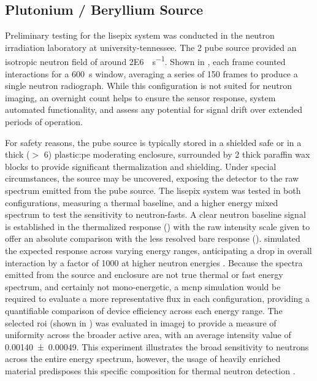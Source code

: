 \documentclass[../../../main.tex]{subfiles}%
\begin{document}
%
    \subsection{Plutonium / Beryllium Source}%
    \label{sec:chapter-4:semiconductor-timepix:pube-source}%
    Preliminary testing for the \gls{lisepix} system was conducted in the neutron irradiation laboratory at \gls{university-tennessee}.
    The \SI{2}{\curie} \gls{pube} source provided an isotropic neutron field of around \SI[per-mode={symbol}]{2E6}{\neutron\per\second}.
    Shown in , each frame counted interactions for a \SI{600}{\second} window, averaging a series of \num{150} frames to produce a single neutron radiograph.
    While this configuration is not suited for neutron imaging, an overnight count helps to ensure the sensor response, system automated functionality, and assess any potential for signal drift over extended periods of operation.
    \par%
    For safety reasons, the \gls{pube} source is typically stored in a shielded safe or in a thick ($>$ \SI{6}{\inch}) \gls{plastic:pe} moderating enclosure, surrounded by \SI{2}{\inch} thick paraffin wax blocks to provide significant thermalization and shielding.
    Under special circumstances, the source may be uncovered, exposing the detector to the raw spectrum emitted from the \gls{pube} source.
    The \gls{lisepix} system was tested in both configurations, measuring a thermal baseline, and a higher energy mixed spectrum to test the sensitivity to \glspl{neutron-fast}.
    A clear neutron baseline signal is established in the thermalized response () with the raw intensity scale given to offer an absolute comparison with the less resolved bare response (). 
    \citeauthor*{Lukosi_2016} simulated the expected response across varying energy ranges, anticipating a drop in overall interaction by a factor of \num{1000} at higher neutron energies \cite{Lukosi_2016}.
    Because the spectra emitted from the source and enclosure are not true thermal or fast energy spectrum, and certainly not mono-energetic, a \gls{mcnp} simulation would be required to evaluate a more representative flux in each configuration, providing a quantifiable comparison of device efficiency across each energy range.
    The selected \gls{roi} (shown in ) was evaluated in \gls{imagej} to provide a measure of uniformity across the broader active area, with an average intensity value of \num{0.00140(49)}.
    This experiment illustrates the broad sensitivity to neutrons across the entire energy spectrum, however, the usage of heavily  enriched material predisposes this specific composition for thermal neutron detection \cite{Herrera_2018}.
\end{document}
